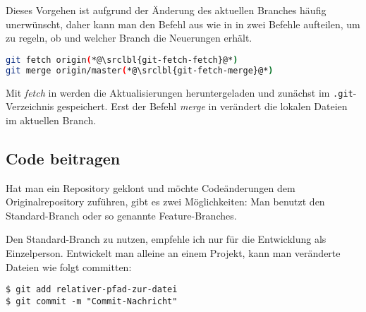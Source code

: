 Dieses Vorgehen ist aufgrund der Änderung des aktuellen Branches häufig unerwünscht, daher kann man den Befehl aus  wie in  in zwei Befehle aufteilen, um zu regeln, ob und welcher Branch die Neuerungen erhält.

\begin{lstlisting}[language=sh,caption={\emph{pull} in zwei Befehlen manuell ausführen},label=\lstlbl{git-fetch-merge}]
git fetch origin(*@\srclbl{git-fetch-fetch}@*)
git merge origin/master(*@\srclbl{git-fetch-merge}@*)
\end{lstlisting}

Mit \emph{fetch} in  werden die Aktualisierungen heruntergeladen und zunächst im \texttt{.git}-Verzeichnis gespeichert. Erst der Befehl \emph{merge} in  verändert die lokalen Dateien im aktuellen Branch.

\subsection{Code beitragen}
Hat man ein Repository geklont und möchte Codeänderungen dem Originalrepository zuführen, gibt es zwei Möglichkeiten: Man benutzt den Standard-Branch oder so genannte Feature-Branches.

Den Standard-Branch zu nutzen, empfehle ich nur für die Entwicklung als Einzelperson. Entwickelt man alleine an einem Projekt, kann man veränderte Dateien wie folgt committen:
\begin{verbatim}
$ git add relativer-pfad-zur-datei
$ git commit -m "Commit-Nachricht"
\end{verbatim}

